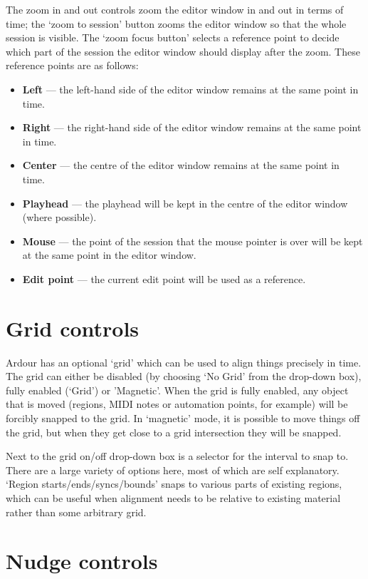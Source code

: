 \documentclass[10pt,a4paper]{book}
\begin{document}
{The zoom in and out controls zoom the editor window in and out in
terms of time; the `zoom to session' button zooms the editor window so
that the whole session is visible.  The `zoom focus button' selects
a reference point to decide which part of the session the editor window
should display after the zoom.  These reference points are as follows:
\begin{itemize}
\item \textbf{Left} --- the left-hand side of the editor window
  remains at the same point in time.
\item \textbf{Right} --- the right-hand side of the editor window
  remains at the same point in time.
\item \textbf{Center} --- the centre of the editor window
  remains at the same point in time.
\item \textbf{Playhead} --- the playhead will be kept in the centre of
  the editor window (where possible).
\item \textbf{Mouse} --- the point of the session that the mouse
  pointer is over will be kept at the same point in the editor window.
\item \textbf{Edit point} --- the current edit point will be used as a reference.
\end{itemize}

\section{Grid controls}

Ardour has an optional `grid' which can be used to align things
precisely in time.  The grid can either be disabled (by choosing `No
Grid' from the drop-down box), fully enabled (`Grid') or 'Magnetic'.
When the grid is fully enabled, any object that is moved (regions,
MIDI notes or automation points, for example) will be forcibly snapped
to the grid.  In `magnetic' mode, it is possible to move things off
the grid, but when they get close to a grid intersection they will be
snapped.

Next to the grid on/off drop-down box is a selector for the interval
to snap to.  There are a large variety of options here, most of which
are self explanatory.  `Region starts/ends/syncs/bounds' snaps to
various parts of existing regions, which can be useful when alignment
needs to be relative to existing material rather than some arbitrary
grid.

\section{Nudge controls}

}
\end{document}
